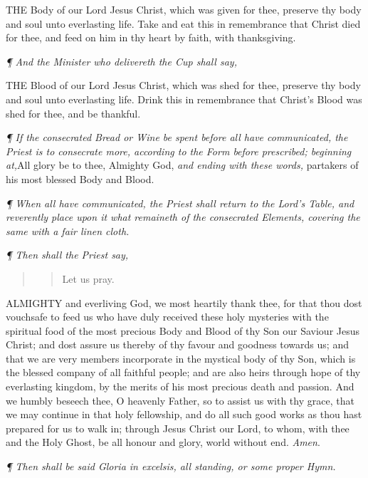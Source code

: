 THE
Body of our Lord Jesus Christ, which was given for thee, preserve thy
body and soul unto everlasting life. Take and eat this in remembrance
that Christ died for thee, and feed on him in thy heart by faith, with
thanksgiving.

\emph{¶
And the Minister who delivereth the Cup shall say,}

THE
Blood of our Lord Jesus Christ, which was shed for thee, preserve thy
body and soul unto everlasting life. Drink this in remembrance that Christ’s
Blood was shed for thee, and be thankful.

\emph{¶
If the consecrated Bread or Wine be spent before all have communicated,
the Priest is to consecrate more, according to the Form before prescribed;
beginning at,}All glory be to thee, Almighty God, \emph{and ending
with these words,} partakers of his most blessed Body and Blood.

\emph{¶
When all have communicated, the Priest shall return to the Lord’s
Table, and reverently place upon it what remaineth of the consecrated
Elements, covering the same with a fair linen cloth.}

\emph{¶
Then shall the Priest say,}

\begin{quote}

\begin{quote}

Let
us pray.

\end{quote}

\end{quote}

ALMIGHTY
and everliving God, we most heartily thank thee, for that thou dost vouchsafe
to feed us who have duly received these holy mysteries with the spiritual
food of the most precious Body and Blood of thy Son our Saviour Jesus
Christ; and dost assure us thereby of thy favour and goodness towards
us; and that we are very members incorporate in the mystical body of thy
Son, which is the blessed company of all faithful people; and are also
heirs through hope of thy everlasting kingdom, by the merits of his most
precious death and passion. And we humbly beseech thee, O heavenly
Father, so to assist us with thy grace, that we may continue in that holy
fellowship, and do all such good works as thou hast prepared for us to
walk in; through Jesus Christ our Lord, to whom, with thee and the Holy
Ghost, be all honour and glory, world without end. \emph{Amen}.

\emph{¶
Then shall be said Gloria in excelsis, all standing, or some proper Hymn.}

